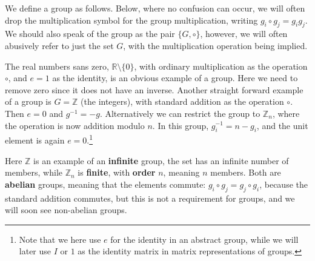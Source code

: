 \documentclass[notes.tex]{subfiles}
\begin{document}
We define a group as follows.
Below, where no confusion can occur, we will often drop the multiplication symbol for the group multiplication, writing $g_i \circ g_j =g_ig_j$. We should also speak of the group as the pair $\{G,\circ\}$, however, we will often abusively refer to just the set $G$, with the multiplication operation being implied.
 
The real numbers sans zero, ${\mathbb R}\setminus \{0\}$, with ordinary multiplication as the operation $\circ$, and $e=1$ as the identity, is an obvious example of a group. Here we need to remove zero since it does not have an inverse. Another straight forward example of a group is $G= \mathbb{Z}$ (the integers), with standard addition as the operation $\circ$. Then $e = 0$ and $g^{-1} = -g$. Alternatively we can restrict the group to $\mathbb{Z}_n$, where the operation is now addition modulo $n$. In this group, $g_i^{-1} = n - g_i$, and the unit element is again $e = 0$.\footnote{Note that we here use $e$ for the identity in an abstract group, while we will later use $I$ or $1$ as the identity matrix in matrix representations of groups.} 

Here  $\mathbb{Z}$ is an example of an {\bf infinite} group, the set has an infinite number of members, while $\mathbb{Z}_n$ is {\bf finite}, with {\bf order} $n$, meaning $n$ members. Both are {\bf abelian} groups, meaning that the elements commute: $g_i \circ g_j = g_j \circ g_i$, because the standard addition commutes, but this is not a requirement for groups, and we will soon see non-abelian groups.
\end{document}
